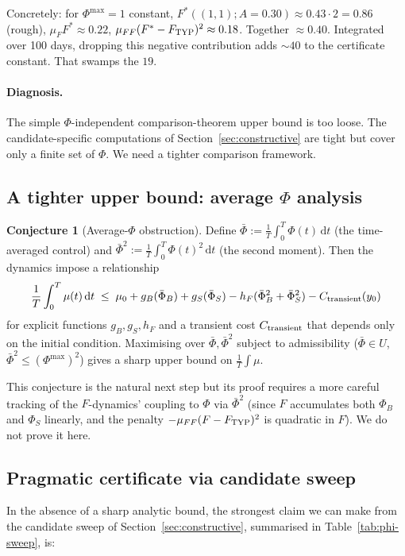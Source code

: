 \documentclass[11pt,a4paper]{article}
\theoremstyle{definition}
\newtheorem{conjecture}[theorem]{Conjecture}
\newcommand{\dd}{\,\mathrm{d}}
\begin{document}
Concretely: for $\Phi^{\max} = 1$ constant, $F^*((1,1); A=0.30) \approx 0.43 \cdot 2 = 0.86$ (rough), $\mu_F F^* \approx 0.22$, $\mu_{FF}(F^* - F_{\rm TYP})^2 \approx 0.18$. Together $\approx 0.40$. Integrated over 100 days, dropping this negative contribution adds $\sim 40$ to the certificate constant. That swamps the $19$.

\paragraph{Diagnosis.} The simple $\Phi$-independent comparison-theorem upper bound is too loose. The candidate-specific computations of Section~\ref{sec:constructive} are tight but cover only a finite set of $\Phi$. We need a tighter comparison framework.

\subsection{A tighter upper bound: average $\Phi$ analysis}

\begin{conjecture}[Average-$\Phi$ obstruction]\label{conj:avg-phi}
Define $\bar\Phi := \frac{1}{T}\int_0^T \Phi(t) \dd t$ (the time-averaged control) and $\bar\Phi^2 := \frac{1}{T}\int_0^T \Phi(t)^2 \dd t$ (the second moment). Then the dynamics impose a relationship
\[
\frac{1}{T}\int_0^T \mu(t)\dd t \;\le\; \mu_0 + g_B(\bar\Phi_B) + g_S(\bar\Phi_S) - h_F(\bar\Phi^2_B + \bar\Phi^2_S) - C_{\rm transient}(y_0)
\]
for explicit functions $g_B, g_S, h_F$ and a transient cost $C_{\rm transient}$ that depends only on the initial condition. Maximising over $\bar\Phi, \bar\Phi^2$ subject to admissibility ($\bar\Phi \in U$, $\bar\Phi^2 \le (\Phi^{\max})^2$) gives a sharp upper bound on $\frac{1}{T}\int \mu$.
\end{conjecture}

This conjecture is the natural next step but its proof requires a more careful tracking of the $F$-dynamics' coupling to $\Phi$ via $\bar\Phi^2$ (since $F$ accumulates both $\Phi_B$ and $\Phi_S$ linearly, and the penalty $-\mu_{FF}(F-F_{\rm TYP})^2$ is quadratic in $F$). We do not prove it here.

\subsection{Pragmatic certificate via candidate sweep}

In the absence of a sharp analytic bound, the strongest claim we can make from the candidate sweep of Section~\ref{sec:constructive}, summarised in Table~\ref{tab:phi-sweep}, is:
\end{document}

